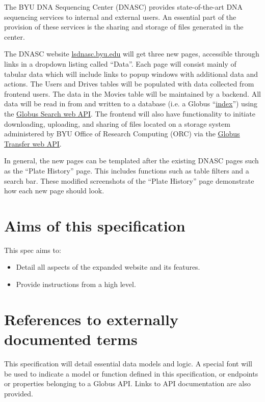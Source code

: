 
The BYU DNA Sequencing Center (DNASC) provides state-of-the-art DNA sequencing services to internal and external 
users. An essential part of the provision of these services is the sharing and storage of files generated in the 
center.

The DNASC website \href{\urllsdnasc}{\uline{lsdnasc.byu.edu}} will get three new pages, accessible through links in a dropdown 
listing called ``Data''. Each page will consist mainly of tabular data which will include links to popup windows with 
additional data and actions. The Users and Drives tables will be populated with data collected from frontend 
users. The data in the Movies table will be maintained by a backend. All data will be read in from and written 
to a database (i.e. a Globus ``\href{\urlglobusindex}{\uline{index}}'') using the 
\href{\urlglobussearch}{\uline{Globus Search web API}}. The frontend will also have functionality 
to initiate downloading, uploading, and sharing of files located on a storage system administered by BYU Office 
of Research Computing (ORC) via the \href{\urlglobustransfer}{\uline{Globus Transfer web API}}.

In general, the new pages can be templated after the existing DNASC pages such as the ``Plate History'' page. This 
includes functions such as table filters and a search bar. 
These modified screenshots of the ``Plate History'' page 
demonstrate how each new page should look.

\section{Aims of this specification}

This spec aims to:

\begin{itemize}
  \item Detail all aspects of the expanded website and its features.
  \item Provide instructions from a high level.
\end{itemize}

\section{References to externally documented terms}

This specification will detail essential data models and logic. A special font will be used to indicate a model 
or function defined in this specification, or endpoints or properties belonging to a Globus API. Links to API 
documentation are also provided.

